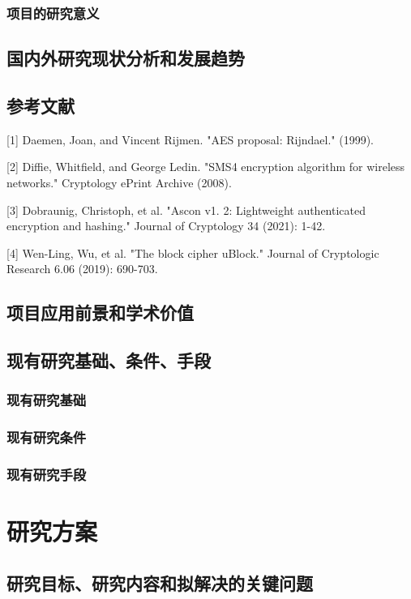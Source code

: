 \documentclass{ctexart}
\begin{document}
\subsubsection{项目的研究意义}

\subsection{国内外研究现状分析和发展趋势}

\subsection{参考文献}
[1] Daemen, Joan, and Vincent Rijmen. "AES proposal: Rijndael." (1999).

[2] Diffie, Whitfield, and George Ledin. "SMS4 encryption algorithm for wireless networks." Cryptology ePrint Archive (2008).

[3] Dobraunig, Christoph, et al. "Ascon v1. 2: Lightweight authenticated encryption and hashing." Journal of Cryptology 34 (2021): 1-42.

[4] Wen-Ling, Wu, et al. "The block cipher uBlock." Journal of Cryptologic Research 6.06 (2019): 690-703.
\subsection{项目应用前景和学术价值}
\subsection{现有研究基础、条件、手段}
\subsubsection{现有研究基础}
\subsubsection{现有研究条件}
\subsubsection{现有研究手段}

\section{研究方案}
\subsection{研究目标、研究内容和拟解决的关键问题}
\end{document}
